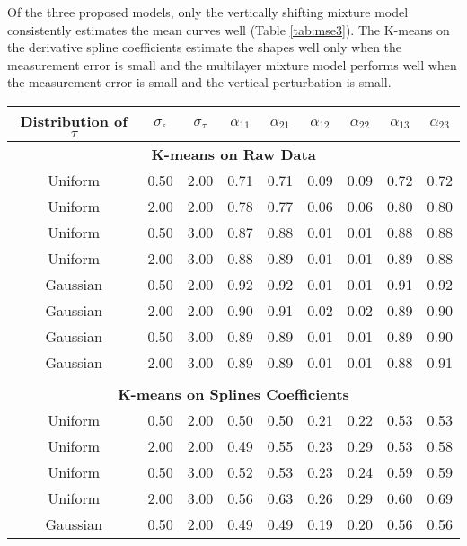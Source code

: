 \documentclass[12pt]{article}
\begin{document}
 Of the three proposed models, only the vertically shifting mixture model consistently estimates the mean curves well (Table \ref{tab:mse3}). The K-means on the derivative spline coefficients estimate the shapes well only when the measurement error is small and the multilayer mixture model performs well when the measurement error is small and the vertical perturbation is small. \\

\begin{table}[ht]
\begin{center}
\begin{tabular}{ccc|cccccc}
  \hline Distribution of $\tau$&$\sigma_{\epsilon}$&$\sigma_{\tau}$&$\alpha_{11}$&$\alpha_{21}$&$\alpha_{12}$&$\alpha_{22}$&$\alpha_{13}$&$\alpha_{23}$\\ \hline\multicolumn{9}{c}{\textbf{K-means on Raw Data}}\\ Uniform & 0.50 & 2.00 & 0.71 & 0.71 & 0.09 & 0.09 & 0.72 & 0.72 \\ 
  Uniform & 2.00 & 2.00 & 0.78 & 0.77 & 0.06 & 0.06 & 0.80 & 0.80 \\ 
  Uniform & 0.50 & 3.00 & 0.87 & 0.88 & 0.01 & 0.01 & 0.88 & 0.88 \\ 
  Uniform & 2.00 & 3.00 & 0.88 & 0.89 & 0.01 & 0.01 & 0.89 & 0.88 \\ 
  Gaussian & 0.50 & 2.00 & 0.92 & 0.92 & 0.01 & 0.01 & 0.91 & 0.92 \\ 
  Gaussian & 2.00 & 2.00 & 0.90 & 0.91 & 0.02 & 0.02 & 0.89 & 0.90 \\ 
  Gaussian & 0.50 & 3.00 & 0.89 & 0.89 & 0.01 & 0.01 & 0.89 & 0.90 \\ 
  Gaussian & 2.00 & 3.00 & 0.89 & 0.89 & 0.01 & 0.01 & 0.88 & 0.91 \\ 
   \\ \multicolumn{9}{c}{\textbf{K-means on Splines Coefficients}}\\Uniform & 0.50 & 2.00 & 0.50 & 0.50 & 0.21 & 0.22 & 0.53 & 0.53 \\ 
  Uniform & 2.00 & 2.00 & 0.49 & 0.55 & 0.23 & 0.29 & 0.53 & 0.58 \\ 
  Uniform & 0.50 & 3.00 & 0.52 & 0.53 & 0.23 & 0.24 & 0.59 & 0.59 \\ 
  Uniform & 2.00 & 3.00 & 0.56 & 0.63 & 0.26 & 0.29 & 0.60 & 0.69 \\ 
  Gaussian & 0.50 & 2.00 & 0.49 & 0.49 & 0.19 & 0.20 & 0.56 & 0.56 \\ 

\end{tabular}
\end{center}
\end{table}
\end{document}
